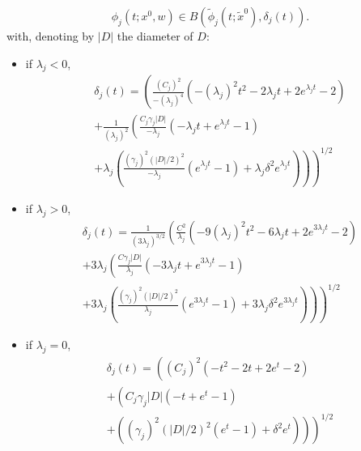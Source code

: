 \begin{theorem}
  $$\phi_{j}(t;x^0,w) \in B(\tilde{\phi}_{j}(t;\tilde{x}^0),\delta_{j}(t)).$$
  with, denoting by $| D |$ the diameter of $D$:
  \begin{itemize}
  \item if $\lambda_{j} <0$,
    \begin{multline}
      \delta_{j} (t) =
      \left( \frac{(C_{j})^2}{-(\lambda_{j})^4} \left( - (\lambda_{j})^2 t^2 - 2 \lambda_{j} t + 2 e^{\lambda_{j} t} - 2 \right) \right.   \\
      + \left. \frac{1}{(\lambda_{j})^2} \left( \frac{C_{j} \gamma_{j} |D|}{-\lambda_{j}} \left( - \lambda_{j} t + e^{\lambda_{j} t} -1 \right) \right. \right.  \\ + \left. \left. \lambda_{j} \left( \frac{(\gamma_{j} )^2 (|D |/2)^2}{-\lambda_{j}} ( e^{\lambda_{j} t } - 1) + \lambda_{j} \delta^2 e^{\lambda_{j} t}  \right) \right)  \right)^{1/2}
    \end{multline}
\item if $\lambda_{j} >0$,
  \begin{multline}
    \delta_{j} (t) = \frac{1}{(3\lambda_{j})^{3/2}} \left( \frac{C^2}{\lambda_{j}} \left( - 9(\lambda_{j})^2 t^2 - 6\lambda_{j} t + 2 e^{3\lambda_{j} t} - 2 \right) \right.   \\
    + \left. 3\lambda_{j} \left( \frac{C \gamma_{j} |D|}{\lambda_{j}} \left( - 3\lambda_{j} t + e^{3\lambda_{j} t} -1 \right) \right. \right.  \\
    + \left. \left. 3\lambda_{j} \left( \frac{(\gamma_{j}) ^2 (|D|/2)^2}{\lambda_{j}} ( e^{3\lambda_{j} t } - 1) + 3\lambda_{j} \delta^2 e^{3\lambda_{j} t}  \right) \right)  \right)^{1/2}
  \end{multline}
\item if $\lambda_{j} = 0$,
  \begin{multline}
    \delta_{j} (t) =
    \left( {(C_{j})^2} \left( -  t^2 - 2  t + 2 e^{ t} - 2 \right) \right.   \\
    + \left.  \left( {C_{j} \gamma_{j} |D|} \left( -  t + e^{ t} -1 \right) \right. \right.  \\ + \left. \left.  \left({(\gamma_{j}) ^2 (|D |/2)^2} ( e^{ t } - 1) +  \delta^2 e^{ t}  \right) \right)  \right)^{1/2}
  \end{multline}
\end{itemize}
\end{theorem}


